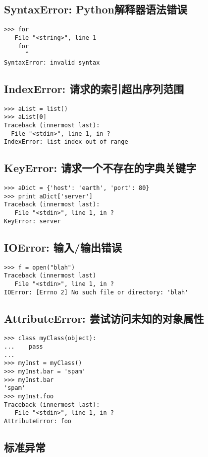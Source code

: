 \documentclass[11pt,a4paper]{article}
\begin{document}
\begin{CJK*}{UTF8}{nsung}
\subsection{SyntaxError: Python解释器语法错误}
\begin{verbatim}
>>> for
   File "<string>", line 1
    for
      ^
SyntaxError: invalid syntax
\end{verbatim}

\subsection{IndexError: 请求的索引超出序列范围}
\begin{verbatim}
>>> aList = list()
>>> aList[0]
Traceback (innermost last):
  File "<stdin>", line 1, in ?
IndexError: list index out of range
\end{verbatim}

\subsection{KeyError: 请求一个不存在的字典关键字}
\begin{verbatim}
>>> aDict = {'host': 'earth', 'port': 80}
>>> print aDict['server']
Traceback (innermost last):
   File "<stdin>", line 1, in ?
KeyError: server
\end{verbatim}

\subsection{IOError: 输入/输出错误}
\begin{verbatim}
>>> f = open("blah")
Traceback (innermost last)
   File "<stdin>", line 1, in ?
IOError: [Errno 2] No such file or directory: 'blah'
\end{verbatim}

\subsection{AttributeError: 尝试访问未知的对象属性}
\begin{verbatim}
>>> class myClass(object):
...    pass
...
>>> myInst = myClass()
>>> myInst.bar = 'spam'
>>> myInst.bar
'spam'
>>> myInst.foo
Traceback (innermost last):
   File "<stdin>", line 1, in ?
AttributeError: foo
\end{verbatim}

\subsection{标准异常}


\end{CJK*}
\end{document}
